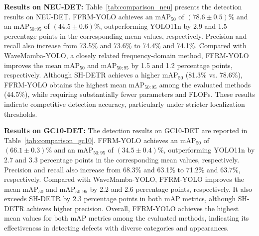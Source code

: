 \documentclass[pdflatex,sn-nature]{sn-jnl}
\begin{document}
\noindent\textbf{Results on NEU-DET:} 
Table~\ref{tab:comparison_neu} presents the detection results on NEU-DET. FFRM-YOLO achieves an $\mathrm{mAP}_{50}$ of $(78.6 \pm 0.5)\%$ and an $\mathrm{mAP}_{50:95}$ of $(44.5 \pm 0.6)\%$, outperforming YOLO11n by 2.9 and 1.5 percentage points in the corresponding mean values, respectively. Precision and recall also increase from 73.5\% and 73.6\% to 74.4\% and 74.1\%. Compared with WaveMamba-YOLO, a closely related frequency-domain method, FFRM-YOLO improves the mean $\mathrm{mAP}_{50}$ and $\mathrm{mAP}_{50:95}$ by 1.5 and 1.2 percentage points, respectively. Although SH-DETR achieves a higher $\mathrm{mAP}_{50}$ (81.3\% vs. 78.6\%), FFRM-YOLO obtains the highest mean $\mathrm{mAP}_{50:95}$ among the evaluated methods (44.5\%), while requiring substantially fewer parameters and FLOPs. These results indicate competitive detection accuracy, particularly under stricter localization thresholds.



\noindent\textbf{Results on GC10-DET:} The detection results on GC10-DET are reported in Table~\ref{tab:comparison_gc10}. FFRM-YOLO achieves an $\mathrm{mAP}_{50}$ of $(66.1 \pm 0.3)\%$ and an $\mathrm{mAP}_{50:95}$ of $(34.5 \pm 0.4)\%$, outperforming YOLO11n by 2.7 and 3.3 percentage points in the corresponding mean values, respectively. Precision and recall also increase from 68.3\% and 63.1\% to 71.2\% and 63.7\%, respectively. Compared with WaveMamba-YOLO, FFRM-YOLO improves the mean $\mathrm{mAP}_{50}$ and $\mathrm{mAP}_{50:95}$ by 2.2 and 2.6 percentage points, respectively. It also exceeds SH-DETR by 2.3 percentage points in both mAP metrics, although SH-DETR achieves higher precision. Overall, FFRM-YOLO achieves the highest mean values for both mAP metrics among the evaluated methods, indicating its effectiveness in detecting defects with diverse categories and appearances.
\end{document}
